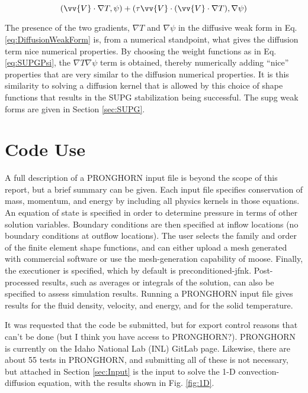 \documentclass[10pt]{article}
\numberwithin{equation}{section} %
\begin{document}
\begin{equation}
\label{eq:AdvectiveWeakForm2}
(\vv{V}\cdot\nabla T,\psi)+(\tau\vv{V}\cdot(\vv{V}\cdot\nabla T),\nabla\psi)
\end{equation}

The presence of the two gradients, \(\nabla T\) and \(\nabla\psi\) in the diffusive weak form in Eq. \eqref{eq:DiffusionWeakForm} is, from a numerical standpoint, what gives the diffusion term nice numerical properties. By choosing the weight functions as in Eq. \eqref{eq:SUPGPsi}, the \(\nabla T\nabla\psi\) term is obtained, thereby numerically adding ``nice'' properties that are very similar to the diffusion numerical properties. It is this similarity to solving a diffusion kernel that is allowed by this choice of shape functions that results in the SUPG stabilization being successful. The \gls{supg} weak forms are given in Section \ref{sec:SUPG}.

\section{Code Use}

A full description of a PRONGHORN input file is beyond the scope of this report, but a brief summary can be given. Each input file specifies conservation of mass, momentum, and energy by including all physics kernels in those equations. An equation of state is specified in order to determine pressure in terms of other solution variables. Boundary conditions are then specified at inflow locations (no boundary conditions at outflow locations). The user selects the family and order of the finite element shape functions, and can either upload a mesh generated with commercial software or use the mesh-generation capability of \gls{moose}. Finally, the executioner is specified, which by default is preconditioned-\gls{jfnk}. Post-processed results, such as averages or integrals of the solution, can also be specified to assess simulation results. Running a PRONGHORN input file gives results for the fluid density, velocity, and energy, and for the solid temperature. 

It was requested that the code be submitted, but for export control reasons that can't be done (but I think you have access to PRONGHORN?). PRONGHORN is currently on the Idaho National Lab (INL) GitLab page. Likewise, there are about 55 tests in PRONGHORN, and submitting all of these is not necessary, but attached in Section \ref{sec:Input} is the input to solve the 1-D convection-diffusion equation, with the results shown in Fig. \ref{fig:1D}.
\end{document}
